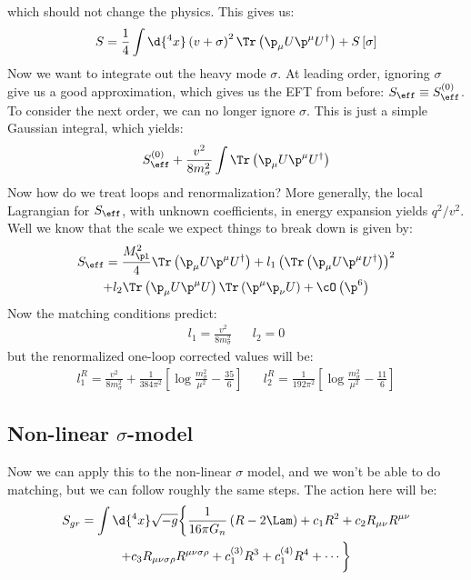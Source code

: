 \documentclass{booc}
\begin{document}
which should not change the physics. This gives us:
\begin{equation}
S = \frac{1}{4} \int \d{^4 x} \left( v + \sigma \right)^2
\Tr\left( \p_\mu U \p^\mu U^\dag \right) + S\left[ \sigma \right]
\end{equation}
Now we want to integrate out the heavy mode $\sigma$.
At leading order, ignoring $\sigma$ give us a good approximation, which gives us
the EFT from before: $S_\eff \equiv S_\eff^{\left( 0 \right)}$.
To consider the next order, we can no longer ignore $\sigma$.
This is just a simple Gaussian integral, which yields:
\begin{equation}
S_\eff^{\left( 0 \right)} + 
\frac{v^2}{8m_\sigma^2} \int \Tr\left( \p_\mu U\p^\mu U^\dag \right)
\end{equation}
Now how do we treat loops and renormalization?
More generally, the local Lagrangian for $S_\eff$, with unknown coefficients,
in energy expansion yields $q^2 / v^2$.
Well we know that the scale we expect things to break down is given by:
\begin{multline}
S_\eff = \frac{M_{\pl}^2}{4} \Tr\left( \p_\mu U \p^\mu U^\dag \right)
+ l_1 \left( \Tr\left( \p_\mu U \p^\mu U^\dag \right) \right)^2 \\+
l_2 \Tr\left( \p_\mu U \p^\mu U \right)\Tr\left( \p^\mu \p_\nu U \right) + 
\cO\left( \p^6 \right)
\end{multline}
Now the matching conditions predict:
\begin{align}
l_1 = \frac{v^2}{8 m_\sigma^2}
&&
l_2 = 0
\end{align}
but the renormalized one-loop corrected values will be:
\begin{align}
l_1^R = \frac{v^2}{8m_\sigma^2} + 
\frac{1}{384 \pi^2} \left[ \log \frac{m_\sigma^2}{\mu^2} - \frac{35}{6} \right]
&&
l_2^R = \frac{1}{192 \pi^2} \left[ \log
\frac{m_\sigma^2}{\mu^2} - \frac{11}{6}\right]
\end{align}

\subsection{Non-linear $\sigma$-model}

Now we can apply this to the non-linear $\sigma$ model, 
and we won't be able to do matching, but we can follow roughly the same steps.
The action here will be:
\begin{multline}
S_{gr} = \int \d{^4 x} \sqrt{-g} \bigg\{ 
\frac{1}{16\pi G_n} \left( R - 2\Lam \right) + c_1 R^2+ 
c_2 R_{\mu\nu}R^{\mu\nu} \\
+ c_3 R_{\mu\nu\sigma\rho}R^{\mu\nu\sigma\rho} + 
c_1^{\left( 3 \right)} R^3 + c_1^{\left( 4 \right)} R^4 + \cdots\bigg\}
\end{multline}
\end{document}
